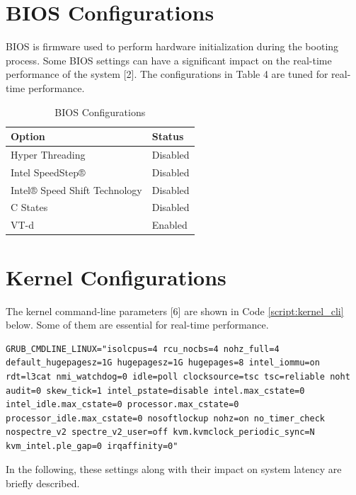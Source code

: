 \documentclass[MMR,Master,english]{twbook}
\begin{document}
\section{BIOS Configurations}
BIOS is firmware used to perform hardware initialization during the booting process. Some BIOS settings can have a significant impact on the real-time performance of the system [2]. The configurations in Table 4 are tuned for real-time performance.

\begin{table}[h]
	\centering
	\caption{BIOS Configurations}
	\begin{tabular}{|l|l|}
	\hline
	\textbf{Option} & \textbf{Status} \\
	\hline
	Hyper Threading & Disabled \\
	\hline
	Intel SpeedStep® & Disabled \\
	\hline
	Intel® Speed Shift Technology & Disabled \\
	\hline
	C States & Disabled \\
	\hline
	VT-d & Enabled \\
	\hline
	\end{tabular}
	\end{table}	
\section{Kernel Configurations}

The kernel command-line parameters [6] are shown in Code \ref{script:kernel_cli} below. Some of them are essential for real-time performance.

\vspace{1em}
\begin{minipage}{0.95\columnwidth}
	\begin{lstlisting}[name={Kernel Configuration},label={script:kernel_cli}]
		GRUB_CMDLINE_LINUX="isolcpus=4 rcu_nocbs=4 nohz_full=4 default_hugepagesz=1G hugepagesz=1G hugepages=8 intel_iommu=on rdt=l3cat nmi_watchdog=0 idle=poll clocksource=tsc tsc=reliable noht audit=0 skew_tick=1 intel_pstate=disable intel.max_cstate=0 intel_idle.max_cstate=0 processor.max_cstate=0 processor_idle.max_cstate=0 nosoftlockup nohz=on no_timer_check nospectre_v2 spectre_v2_user=off kvm.kvmclock_periodic_sync=N kvm_intel.ple_gap=0 irqaffinity=0"
\end{lstlisting}
\end{minipage}

\noindent In the following, these settings along with their impact on system latency are briefly described. 
\end{document}

